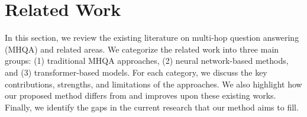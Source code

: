 \section{Related Work}
\label{related_work}
In this section, we review the existing literature on multi-hop question answering (MHQA) and related areas. We categorize the related work into three main groups: (1) traditional MHQA approaches, (2) neural network-based methods, and (3) transformer-based models. For each category, we discuss the key contributions, strengths, and limitations of the approaches. We also highlight how our proposed method differs from and improves upon these existing works. Finally, we identify the gaps in the current research that our method aims to fill.